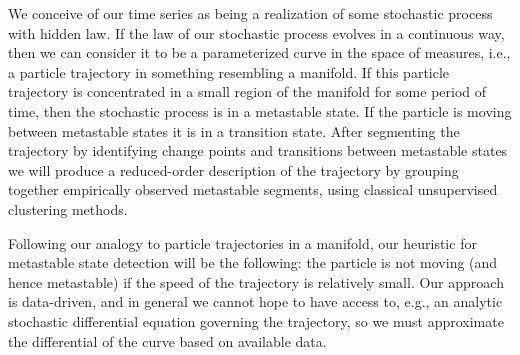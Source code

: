 \documentclass{article}
\newif\ifshowcomments
\newcommand{\DCGedit}[2]{%
  \ifshowcomments
    \textcolor{gray}{\sout{#1}}%
    \textcolor{magenta}{[#2]}%
  \fi
}
\begin{document}
We conceive of our time series as being a realization of some stochastic process with hidden law. If the law of our stochastic process evolves in a continuous way, then we can consider it to be a parameterized curve in the space of measures, i.e., a particle trajectory in something resembling a manifold. If this particle trajectory is concentrated in a small region of the manifold for some period of time, then the stochastic process is in a metastable state. If the particle is moving between metastable states it is in a transition state. After segmenting the trajectory by identifying change points and transitions between metastable states we will produce a reduced-order description of the trajectory by grouping together empirically observed metastable segments, using classical unsupervised clustering methods.

Following our analogy to particle trajectories in a manifold, our heuristic for metastable state detection will be the following: the particle is not moving (and hence metastable) if the speed of the trajectory is relatively small. Our approach is data-driven, and in general we cannot hope to have access to, e.g., an analytic stochastic differential equation governing the trajectory, so we must approximate the differential of the curve based on available data. %
\end{document}
